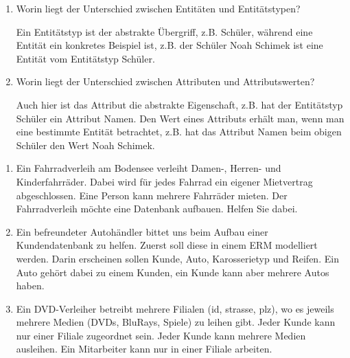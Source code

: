 \begin{Answer}[ref=ERMFragen1]
	\begin{enumerate}
		\item Worin liegt der Unterschied zwischen Entitäten und Entitätstypen?

		Ein Entitätstyp ist der abstrakte Übergriff, z.B. Schüler, während eine Entität ein konkretes Beispiel ist, z.B. der Schüler Noah Schimek ist eine Entität vom Entitätstyp Schüler.
		\item Worin liegt der Unterschied zwischen Attributen und Attributswerten?

		Auch hier ist das Attribut die abstrakte Eigenschaft, z.B. hat der Entitätstyp Schüler ein Attribut Namen. Den Wert eines Attributs erhält man, wenn man eine bestimmte Entität betrachtet, z.B. hat das Attribut Namen beim obigen Schüler den Wert Noah Schimek.
	\end{enumerate}
\end{Answer}
\begin{Exercise}[title={Erstelle jeweils ein ERM}, label=ERMErstellen1]
	\begin{enumerate}
		\item Ein Fahrradverleih am Bodensee verleiht Damen-, Herren- und Kinderfahrräder. Dabei wird für jedes Fahrrad ein eigener Mietvertrag abgeschlossen. Eine Person kann mehrere Fahrräder mieten. Der Fahrradverleih möchte eine Datenbank aufbauen. Helfen Sie dabei.
		\item Ein befreundeter Autohändler bittet uns beim Aufbau einer Kundendatenbank zu helfen. Zuerst soll diese in einem ERM modelliert werden. Darin erscheinen sollen Kunde, Auto, Karosserietyp und Reifen. Ein Auto gehört dabei zu einem Kunden, ein Kunde kann aber mehrere Autos haben.
		\item Ein DVD-Verleiher betreibt mehrere Filialen (id, strasse, plz), wo es jeweils mehrere Medien (DVDs, BluRays, Spiele) zu leihen gibt. Jeder Kunde kann nur einer Filiale zugeordnet sein. Jeder Kunde kann mehrere Medien ausleihen. Ein Mitarbeiter kann nur in einer Filiale arbeiten.
	\end{enumerate}
\end{Exercise}
